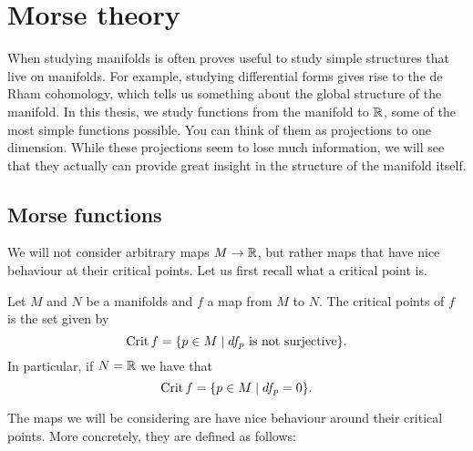 \chapter{Morse theory}

When studying manifolds is often proves useful to study simple structures that live on manifolds. For example, studying differential forms gives rise to the de Rham cohomology, which tells us something about the global structure of the manifold. In this thesis, we study functions from the manifold to $\mathbb{R}$, some of the most simple functions possible. You can think of them as projections  to one dimension.
While these projections seem to lose much information, we will see that they actually can provide great insight in the structure of the manifold itself.

\section{Morse functions}

We will not consider arbitrary maps $M \to \mathbb{R}$, but rather maps that have nice behaviour at their critical points. Let us first recall what a critical point is.

\begin{definition}
    Let $M$ and $N$ be a manifolds and  $f$ a map from $M$ to $N$.
    The critical points of $f$ is the set given by
    \[
    \operatorname{Crit} f = \{p \in M  \mid \text{$df_p$ is not surjective}\} 
    .\] 
    In particular, if $N = \mathbb{R}$ we have that
    \[
    \operatorname{Crit} f = \{ p \in M  \mid  df_p = 0\} 
    .\] 
\end{definition}
The maps we will be considering are have nice behaviour around their critical points.
More concretely, they are defined as follows:

